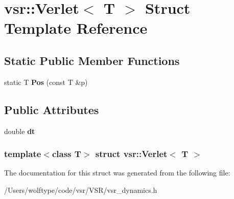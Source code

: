 \hypertarget{structvsr_1_1_verlet}{\section{vsr\-:\-:Verlet$<$ T $>$ Struct Template Reference}
\label{structvsr_1_1_verlet}
}
\subsection*{Static Public Member Functions}
\begin{DoxyCompactItemize}
\item 
\hypertarget{structvsr_1_1_verlet_a057d4a80ae107b2cae46b62d870dc930}{static T {\bfseries Pos} (const T \&p)}\label{structvsr_1_1_verlet_a057d4a80ae107b2cae46b62d870dc930}

\end{DoxyCompactItemize}
\subsection*{Public Attributes}
\begin{DoxyCompactItemize}
\item 
\hypertarget{structvsr_1_1_verlet_a882bb7f02b9f4aa7597d4fa8ac01b3ff}{double {\bfseries dt}}\label{structvsr_1_1_verlet_a882bb7f02b9f4aa7597d4fa8ac01b3ff}

\end{DoxyCompactItemize}
\subsubsection*{template$<$class T$>$ struct vsr\-::\-Verlet$<$ T $>$}



The documentation for this struct was generated from the following file\-:\begin{DoxyCompactItemize}
\item 
/\-Users/wolftype/code/vsr/\-V\-S\-R/vsr\-\_\-dynamics.\-h\end{DoxyCompactItemize}
